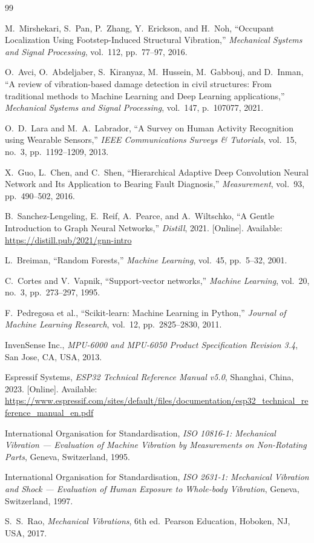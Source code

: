 \documentclass[12pt,a4paper]{report}
\begin{document}
\begin{thebibliography}{99}

M.\ Mirshekari, S.\ Pan, P.\ Zhang, Y.\ Erickson, and H.\ Noh,
``Occupant Localization Using Footstep-Induced Structural Vibration,''
\textit{Mechanical Systems and Signal Processing}, vol.\ 112, pp.\ 77--97, 2016.

O.\ Avci, O.\ Abdeljaber, S.\ Kiranyaz, M.\ Hussein, M.\ Gabbouj, and D.\ Inman,
``A review of vibration-based damage detection in civil structures: From
traditional methods to Machine Learning and Deep Learning applications,''
\textit{Mechanical Systems and Signal Processing}, vol.\ 147, p.\ 107077, 2021.

O.~D.\ Lara and M.~A.\ Labrador,
``A Survey on Human Activity Recognition using Wearable Sensors,''
\textit{IEEE Communications Surveys \& Tutorials}, vol.\ 15, no.\ 3,
pp.\ 1192--1209, 2013.

X.\ Guo, L.\ Chen, and C.\ Shen,
``Hierarchical Adaptive Deep Convolution Neural Network and Its Application
to Bearing Fault Diagnosis,''
\textit{Measurement}, vol.\ 93, pp.\ 490--502, 2016.

B.\ Sanchez-Lengeling, E.\ Reif, A.\ Pearce, and A.\ Wiltschko,
``A Gentle Introduction to Graph Neural Networks,''
\textit{Distill}, 2021. [Online]. Available: \url{https://distill.pub/2021/gnn-intro}

L.\ Breiman,
``Random Forests,''
\textit{Machine Learning}, vol.\ 45, pp.\ 5--32, 2001.

C.\ Cortes and V.\ Vapnik,
``Support-vector networks,''
\textit{Machine Learning}, vol.\ 20, no.\ 3, pp.\ 273--297, 1995.

F.\ Pedregosa et al.,
``Scikit-learn: Machine Learning in Python,''
\textit{Journal of Machine Learning Research}, vol.\ 12, pp.\ 2825--2830, 2011.

InvenSense Inc.,
\textit{MPU-6000 and MPU-6050 Product Specification Revision 3.4},
San Jose, CA, USA, 2013.

Espressif Systems,
\textit{ESP32 Technical Reference Manual v5.0},
Shanghai, China, 2023. [Online]. Available:
\url{https://www.espressif.com/sites/default/files/documentation/esp32_technical_reference_manual_en.pdf}

International Organisation for Standardisation,
\textit{ISO 10816-1: Mechanical Vibration --- Evaluation of Machine Vibration
by Measurements on Non-Rotating Parts}, Geneva, Switzerland, 1995.

International Organisation for Standardisation,
\textit{ISO 2631-1: Mechanical Vibration and Shock --- Evaluation of Human
Exposure to Whole-body Vibration}, Geneva, Switzerland, 1997.

S.~S.\ Rao,
\textit{Mechanical Vibrations}, 6th ed.\
Pearson Education, Hoboken, NJ, USA, 2017.

\end{thebibliography}
\end{document}
